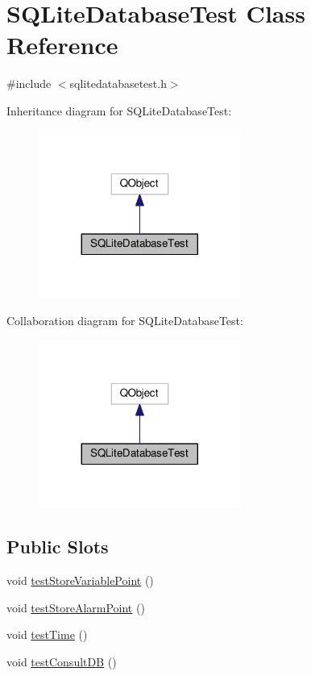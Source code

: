\hypertarget{class_s_q_lite_database_test}{}\section{S\+Q\+Lite\+Database\+Test Class Reference}
\label{class_s_q_lite_database_test}


{\ttfamily \#include $<$sqlitedatabasetest.\+h$>$}



Inheritance diagram for S\+Q\+Lite\+Database\+Test\+:
\nopagebreak
\begin{figure}[H]
\begin{center}
\leavevmode
\includegraphics[width=188pt]{class_s_q_lite_database_test__inherit__graph}
\end{center}
\end{figure}


Collaboration diagram for S\+Q\+Lite\+Database\+Test\+:
\nopagebreak
\begin{figure}[H]
\begin{center}
\leavevmode
\includegraphics[width=188pt]{class_s_q_lite_database_test__coll__graph}
\end{center}
\end{figure}
\subsection*{Public Slots}
\begin{DoxyCompactItemize}
\item 
void \hyperlink{class_s_q_lite_database_test_ab70a6f650a0f943f58c35238076c2193}{test\+Store\+Variable\+Point} ()
\item 
void \hyperlink{class_s_q_lite_database_test_ac920cf99b188422327db8cf04ee4584f}{test\+Store\+Alarm\+Point} ()
\item 
void \hyperlink{class_s_q_lite_database_test_a495a671f9e3c82143affa48f13159c3e}{test\+Time} ()
\item 
void \hyperlink{class_s_q_lite_database_test_abe9ddbf6bfa2b46d94a53deb71090eb1}{test\+Consult\+D\+B} ()
\end{DoxyCompactItemize}
